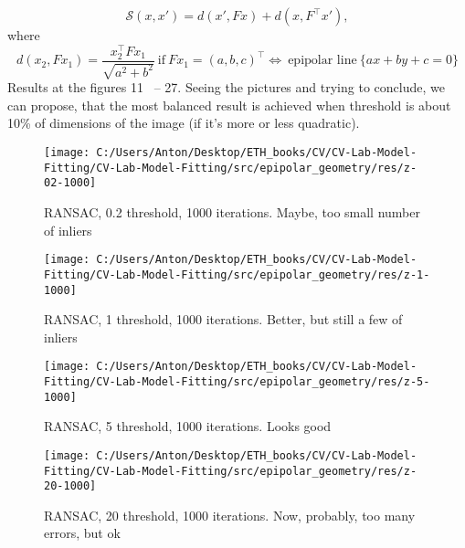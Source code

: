 \documentclass{report}
\begin{document}
	$$\mathcal{S}(x,x') = d(x', Fx) + d(x, F^\top x'),$$ where
	$$ d(x_2, Fx_1) = \dfrac{x_2^\top Fx_1}{\sqrt{a^2+b^2}} \:\text{if}\:Fx_1 = (a, b, c)^\top \iff \:\text{epipolar line}\:\{ax+by+c=0\}$$
	Results at the figures 11 ~-- 27. Seeing the pictures and trying to conclude, we can propose, that the most balanced result is achieved when threshold is about 10\% of dimensions of the image (if it's more or less quadratic).
	\begin{figure}[h!]
		\begin{center}
			\begin{minipage}[h]{0.9\linewidth}
				\texttt{[image: C:/Users/Anton/Desktop/ETH\_books/CV/CV-Lab-Model-Fitting/CV-Lab-Model-Fitting/src/epipolar\_geometry/res/z-02-1000]}
				\caption{RANSAC, 0.2 threshold, 1000 iterations. Maybe, too small number of inliers}
			\end{minipage}
		\end{center}
	\end{figure} 
	\begin{figure}[h!]
		\begin{center}
			\begin{minipage}[h]{0.9\linewidth}
				\texttt{[image: C:/Users/Anton/Desktop/ETH\_books/CV/CV-Lab-Model-Fitting/CV-Lab-Model-Fitting/src/epipolar\_geometry/res/z-1-1000]}
				\caption{RANSAC, 1 threshold, 1000 iterations. Better, but still a few of inliers}
			\end{minipage}
		\end{center}
	\end{figure}
		\begin{figure}[h!]
		\begin{center}
			\begin{minipage}[h]{0.9\linewidth}
				\texttt{[image: C:/Users/Anton/Desktop/ETH\_books/CV/CV-Lab-Model-Fitting/CV-Lab-Model-Fitting/src/epipolar\_geometry/res/z-5-1000]}
				\caption{RANSAC, 5 threshold, 1000 iterations. Looks good}
			\end{minipage}
		\end{center}
	\end{figure}
	
	\begin{figure}[h!]
		\begin{center}
			\begin{minipage}[h]{0.9\linewidth}
				\texttt{[image: C:/Users/Anton/Desktop/ETH\_books/CV/CV-Lab-Model-Fitting/CV-Lab-Model-Fitting/src/epipolar\_geometry/res/z-20-1000]}
				\caption{RANSAC, 20 threshold, 1000 iterations. Now, probably, too many errors, but ok}
			\end{minipage}
		\end{center}
	\end{figure}
\end{document}
